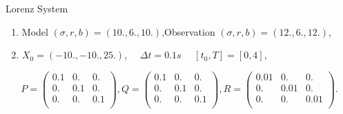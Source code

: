 \begin{frame}[allowframebreaks]{Lorenz System}
	\begin{figure}
		\centering
	\end{figure}

	\newpage
 
	\begin{enumerate}[\textbullet]
	     	\item Model $(\sigma, r, b)=(10.,6.,10.)$,Observation $(\sigma, r, b)=(12.,6.,12.)$,
	        \item $X_0=(-10.,-10.,25.)$, $\quad \Delta t=0.1s$ $\quad [t_0,T]=[0,4]$,
	\end{enumerate}
    $$P=\begin{pmatrix}
    0.1 & 0. & 0. \\
    0. & 0.1 & 0. \\
    0. & 0. & 0.1 \\
    \end{pmatrix} ,
    Q=\begin{pmatrix}
    0.1 & 0. & 0. \\
    0. & 0.1 & 0. \\
    0. & 0. & 0.1 \\
    \end{pmatrix},
    R=\begin{pmatrix}
    0.01 & 0. & 0. \\
    0. & 0.01 & 0. \\
    0. & 0. & 0.01 \\
    \end{pmatrix}.$$ 

	\begin{figure}
		\centering
    \end{figure}
\end{frame}
	